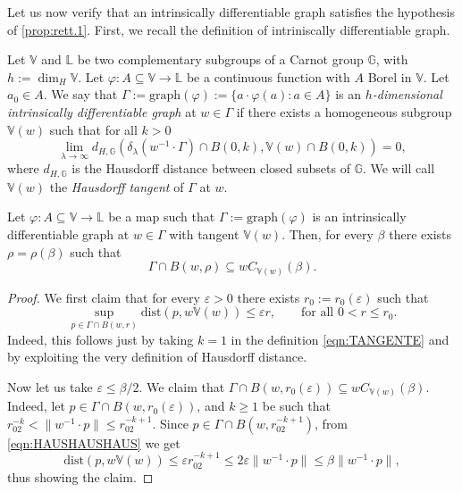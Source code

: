 \documentclass[10pt, a4paper,
oneside, headinclude,footinclude]{scrartcl}
\begin{document}
Let us now verify that an intrinsically differentiable graph satisfies the hypothesis of \cref{prop:rett.1}. First, we recall the definition of intriniscally differentiable graph.
\begin{definizione}\label{defiintrinsicdiffgraph}
   Let $\mathbb V$ and $\mathbb L$ be two complementary subgroups of a Carnot group $\mathbb G$, with $h:=\dim_H\mathbb V$. Let ${\varphi}:A\subseteq \mathbb V \to\mathbb L$ be a continuous function with $A$ Borel in $\mathbb V$. Let $a_0\in A$. We say that $\Gamma:=\mathrm{graph}(\varphi):=\{a\cdot\varphi(a):a\in A\}$ is an {\em $h$-dimensional intrinsically differentiable graph} at $w\in\Gamma$ if there exists a homogeneous subgroup $\mathbb V(w)$ such that for all $k>0$
    \begin{equation}\label{eqn:TANGENTE}
\lim_{\lambda \to \infty } d_{H,\mathbb G}\left(\delta _\lambda (w^{-1}\cdot\Gamma )\cap B(0,k), \mathbb V(w)\cap B(0,k)\right)=0,
    \end{equation}
    where $d_{H,\mathbb G}$ is the Hausdorff distance between closed subsets of $\mathbb G$. We will call $\mathbb V(w)$ the {\em Hausdorff tangent} of $\Gamma$ at $w$.
    \end{definizione}
    
    \begin{lemma}\label{prop:idiffapproximatetangent}
    Let $\varphi:A\subseteq \mathbb V\to\mathbb L$ be a map such that $\Gamma:=\mathrm{graph}(\varphi)$ is an intrinsically differentiable graph at $w\in\Gamma$ with tangent $\mathbb V(w)$. Then, for every $\beta$ there exists $\rho=\rho(\beta)$ such that 
    $$
    \Gamma\cap B(w,\rho)\subseteq w C_{\mathbb V(w)}(\beta).
    $$
    \end{lemma}
    \begin{proof}
    We first claim that for every $\varepsilon>0$ there exists $r_0:=r_0(\varepsilon)$ such that 
    \begin{equation}\label{eqn:HAUSHAUSHAUS}
    \sup_{p\in \Gamma\cap B(w,r)}\mathrm{dist}(p,w\mathbb V(w))\leq \varepsilon r, \qquad \text{for all $0<r\leq r_0$}.
    \end{equation}
    Indeed, this follows just by taking $k=1$ in the definition \eqref{eqn:TANGENTE} and by exploiting the very definition of Hausdorff distance.
    
    Now let us take $\varepsilon\leq \beta/2$. We claim that $\Gamma\cap B(w,r_0(\varepsilon))\subseteq wC_{\mathbb V(w)}(\beta)$. Indeed, let $p\in \Gamma\cap B(w,r_0(\varepsilon))$, and $k\geq 1$ be such that $r_02^{-k}< \|w^{-1}\cdot p\|\leq r_02^{-k+1}$. Since $p\in \Gamma\cap B(w,r_02^{-k+1})$, from \eqref{eqn:HAUSHAUSHAUS} we get
    $$
    \mathrm{dist}(p,w\mathbb V(w))\leq \varepsilon r_02^{-k+1} \leq 2\varepsilon\|w^{-1}\cdot p\|\leq \beta \|w^{-1}\cdot p\|,
    $$
    thus showing the claim.
    \end{proof}
    
\end{document}
